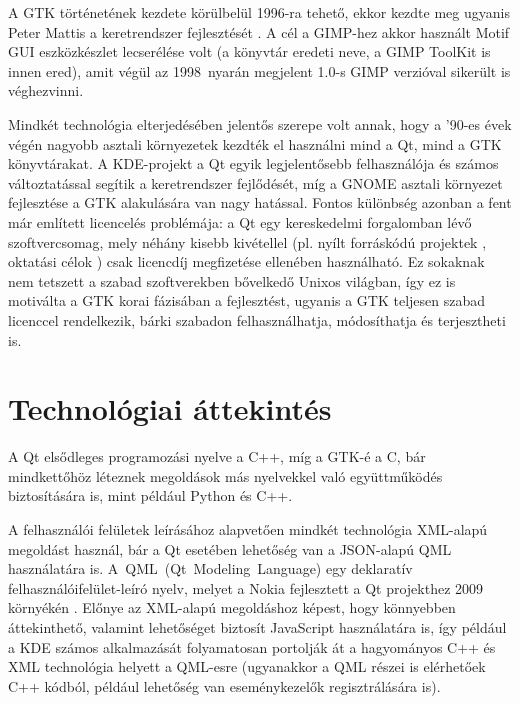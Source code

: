 A GTK történetének kezdete körülbelül 1996-ra tehető, ekkor kezdte meg ugyanis Peter Mattis a keretrendszer fejlesztését \cite{GtkWiki}. A cél a GIMP-hez akkor használt Motif GUI eszközkészlet lecserélése volt (a könyvtár eredeti neve, a GIMP ToolKit is innen ered), amit végül az 1998~nyarán megjelent 1.0-s GIMP verzióval sikerült is véghezvinni.

Mindkét technológia elterjedésében jelentős szerepe volt annak, hogy a '90-es évek végén nagyobb asztali környezetek kezdték el használni mind a Qt, mind a GTK könyvtárakat. A KDE-projekt a Qt egyik legjelentősebb felhasználója és számos változtatással segítik a keretrendszer fejlődését, míg a GNOME asztali környezet fejlesztése a GTK alakulására van nagy hatással. Fontos különbség azonban a fent már említett licencelés problémája: a Qt egy kereskedelmi forgalomban lévő szoftvercsomag, mely néhány kisebb kivétellel (pl. nyílt forráskódú projektek \cite{QtOpenSource}, oktatási célok \cite{QtEdu}) csak licencdíj megfizetése ellenében használható. Ez sokaknak nem tetszett a szabad szoftverekben bővelkedő Unixos világban, így ez is motiválta a GTK korai fázisában a fejlesztést, ugyanis a GTK teljesen szabad licenccel rendelkezik, bárki szabadon felhasználhatja, módosíthatja és terjesztheti is.

\section{Technológiai áttekintés}
A Qt elsődleges programozási nyelve a C++, míg a GTK-é a C, bár mindkettőhöz léteznek megoldások más nyelvekkel való együttműködés biztosítására is, mint például Python és C++.

A felhasználói felületek leírásához alapvetően mindkét technológia XML-alapú megoldást használ, bár a Qt esetében lehetőség van a JSON-alapú QML használatára is. A~QML~(Qt~Modeling~Language) egy deklaratív felhasználóifelület-leíró nyelv, melyet a Nokia fejlesztett a Qt projekthez 2009 környékén \cite{QmlWiki}. Előnye az XML-alapú megoldáshoz képest, hogy könnyebben áttekinthető, valamint lehetőséget biztosít JavaScript használatára is, így például a KDE számos alkalmazását folyamatosan portolják át a hagyományos C++ és XML technológia helyett a QML-esre (ugyanakkor a QML részei is elérhetőek C++ kódból, például lehetőség van eseménykezelők regisztrálására is).


